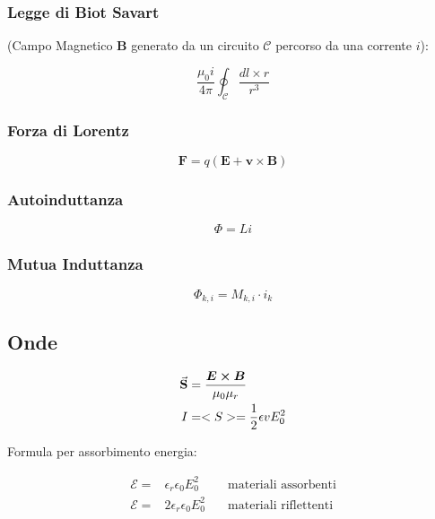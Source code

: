 \documentclass[a4paper]{scrarticle}
\begin{document}
\subsubsection*{Legge di Biot Savart} 
(Campo Magnetico $\bm B$  generato da un circuito $\mathcal{C}$ percorso da una corrente $i$):

\begin{equation}
    \frac{\mu_0 i}{4 \pi} \oint_{\mathcal{C}} \frac {dl \times r}{r^3}
\end{equation}

\subsubsection*{Forza di Lorentz}

\begin{equation}
   \bm F = q (\bm E + \bm v \times \bm B )
\end{equation}

\subsubsection*{Autoinduttanza}
\begin{equation}
    \varPhi = L i
\end{equation}

\subsubsection*{Mutua Induttanza} 
\begin{equation}
    \varPhi_{k, i} = M_{k , i} \cdot i_k 
\end{equation}



\subsection{Onde}

\begin{align}
    \va S & = \frac{\bm E \cross \bm B}{\mu_0 \mu_r}\\
    I & = <S> = \frac{1}{2}\epsilon v E^2_0
\end{align}

Formula per assorbimento energia:

\begin{align}
    \mathcal E =&  \epsilon_r \epsilon_0 E_0^2\quad &\text {materiali assorbenti}\\
    \mathcal E =& 2\epsilon_r \epsilon_0 E_0^2\quad &\text {materiali riflettenti}
\end{align}
\end{document}
